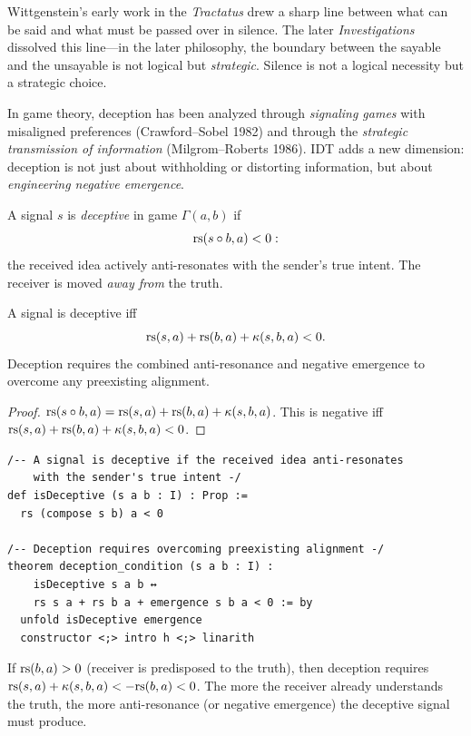 Wittgenstein's early work in the \emph{Tractatus} drew a sharp line between
what can be said and what must be passed over in silence. The later
\emph{Investigations} dissolved this line---in the later philosophy, the
boundary between the sayable and the unsayable is not logical but
\emph{strategic}. Silence is not a logical necessity but a strategic choice.

In game theory, deception has been analyzed through \emph{signaling games}
with misaligned preferences (Crawford--Sobel 1982) and through the
\emph{strategic transmission of information} (Milgrom--Roberts 1986). IDT adds
a new dimension: deception is not just about withholding or distorting
information, but about \emph{engineering negative emergence}.

\begin{definition}
\label{def:deceptive-signal}
A signal $s$ is \emph{deceptive} in game $\Gamma(a, b)$ if
\[
\mathrm{rs}(s \circ b, a) < 0:
\]
the received idea actively anti-resonates with the sender's true intent.
The receiver is moved \emph{away from} the truth.
\end{definition}

\begin{theorem}
\label{thm:deception-decomp}
A signal is deceptive iff
\[
\mathrm{rs}(s, a) + \mathrm{rs}(b, a) + \kappa(s, b, a) < 0.
\]
Deception requires the combined anti-resonance and negative emergence to
overcome any preexisting alignment.
\end{theorem}

\begin{proof}
$\mathrm{rs}(s \circ b, a) = \mathrm{rs}(s,a) + \mathrm{rs}(b,a) + \kappa(s,b,a)$. This is
negative iff $\mathrm{rs}(s,a) + \mathrm{rs}(b,a) + \kappa(s,b,a) < 0$.
\end{proof}

\begin{lstlisting}[caption={Lean 4: Deception characterization}]
/-- A signal is deceptive if the received idea anti-resonates
    with the sender's true intent -/
def isDeceptive (s a b : I) : Prop :=
  rs (compose s b) a < 0

/-- Deception requires overcoming preexisting alignment -/
theorem deception_condition (s a b : I) :
    isDeceptive s a b ↔
    rs s a + rs b a + emergence s b a < 0 := by
  unfold isDeceptive emergence
  constructor <;> intro h <;> linarith
\end{lstlisting}

\begin{corollary}
\label{cor:deception-hard}
If $\mathrm{rs}(b, a) > 0$ (receiver is predisposed to the truth), then deception
requires $\mathrm{rs}(s, a) + \kappa(s, b, a) < -\mathrm{rs}(b, a) < 0$. The more the
receiver already understands the truth, the more anti-resonance (or negative
emergence) the deceptive signal must produce.
\end{corollary}

